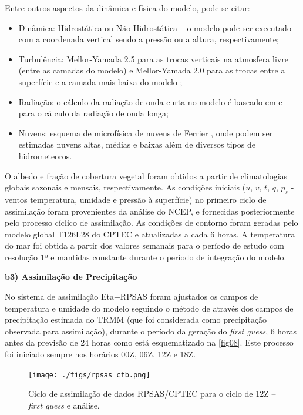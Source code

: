 Entre outros aspectos da dinâmica e física do modelo, pode-se citar:
 
\begin{itemize}
\item Dinâmica: Hidrostática ou Não-Hidrostática – o modelo pode ser executado com a coordenada vertical sendo a pressão ou a altura, respectivamente;
\item Turbulência: Mellor-Yamada 2.5 para as trocas verticais na atmosfera livre (entre as camadas do modelo) e Mellor-Yamada 2.0 para as trocas entre a superfície e a camada mais baixa do modelo \cite{melloryamada74};
\item Radiação: o cálculo da radiação de onda curta no modelo é baseado em  e  para o cálculo da radiação de onda longa;
\item Nuvens: esquema de microfísica de nuvens de Ferrier \cite{ferrieretal02}, onde podem ser estimadas nuvens altas, médias e baixas além de diversos tipos de hidrometeoros.
\end{itemize}

O albedo e fração de cobertura vegetal foram obtidos a partir de climatologias globais sazonais e mensais, respectivamente. As condições iniciais ($u$, $v$, $t$, $q$, $p_{s}$ - ventos temperatura, umidade e pressão à superfície) no primeiro ciclo de assimilação foram provenientes da análise do NCEP, e fornecidas posteriormente pelo processo cíclico de assimilação.  As condições de contorno foram geradas pelo modelo global T126L28 do CPTEC e atualizadas a cada 6 horas. A temperatura do mar foi obtida a partir dos valores semanais para o período de estudo com resolução 1º e mantidas constante durante o período de integração do modelo.

\break

\textbf{b3) Assimilação de Precipitação}

No sistema de assimilação Eta+RPSAS foram ajustados os campos de temperatura e umidade do modelo seguindo o método de  através dos campos de precipitação estimada do TRMM (que foi considerada como precipitação observada para assimilação), durante o período da geração do \textit{first guess}, 6 horas antes da previsão de 24 horas como está esquematizado na \autoref{fig08}. Este processo foi iniciado sempre nos horários 00Z, 06Z, 12Z e 18Z.

\begin{figure}[!h]
\centering
\texttt{[image: ./figs/rpsas\_cfb.png]}
\caption{Ciclo de assimilação de dados RPSAS/CPTEC para o ciclo de 12Z – \textit{first guess} e análise.}
\label{fig08}
\end{figure}

